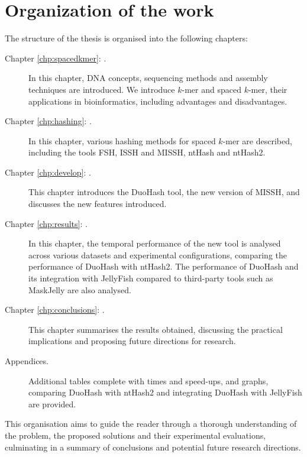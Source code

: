 \section{Organization of the work}
\label{sec:thesis-organization}

The structure of the thesis is organised into the following chapters:

\begin{description}
	\item[Chapter \ref{chp:spacedkmer}: .] In this chapter, DNA concepts, sequencing methods and assembly techniques are introduced. We introduce $k$-mer and spaced $k$-mer, their applications in bioinformatics, including advantages and disadvantages.
	\item[Chapter \ref{chp:hashing}: .] In this chapter, various hashing methods for spaced $k$-mer are described, including the tools \ac{FSH}, \ac{ISSH} and \ac{MISSH}, ntHash and ntHash2.
	\item[Chapter \ref{chp:develop}: .] This chapter introduces the DuoHash tool, the new version of MISSH, and discusses the new features introduced.
	\item[Chapter \ref{chp:results}: .] In this chapter, the temporal performance of the new tool is analysed across various datasets and experimental configurations, comparing the performance of DuoHash with ntHash2. The performance of DuoHash and its integration with JellyFish compared to third-party tools such as MaskJelly are also analysed.
	\item[Chapter \ref{chp:conclusions}: .] This chapter summarises the results obtained, discussing the practical implications and proposing future directions for research.
	\item[Appendices.] Additional tables complete with times and speed-ups, and graphs, comparing DuoHash with ntHash2 and integrating DuoHash with JellyFish are provided.
\end{description}

This organisation aims to guide the reader through a thorough understanding of the problem, the proposed solutions and their experimental evaluations, culminating in a summary of conclusions and potential future research directions.